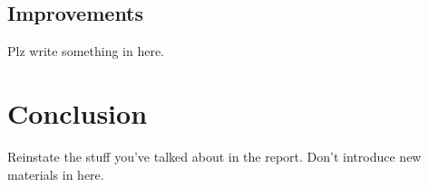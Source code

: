\documentclass[a4paper, 11pt]{article}
\begin{document}
    \subsection{Improvements}
        Plz write something in here.

\section{Conclusion}\label{sec:conc}
    Reinstate the stuff you've talked about in the report. Don't introduce new materials in here.

\pagebreak

\renewcommand{\bibname}{References}
\renewcommand{\bibsection}{\section{\bibname}}
\renewcommand{\cite}{\citep}

\pagebreak
\end{document}
